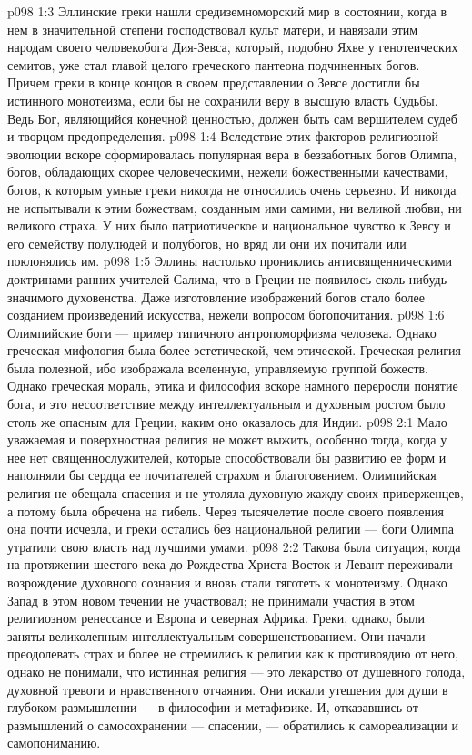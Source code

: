 \vs p098 1:3 Эллинские греки нашли средиземноморский мир в состоянии, когда в нем в значительной степени господствовал культ матери, и навязали этим народам своего человекобога Дия\hyp{}Зевса, который, подобно Яхве у генотеических семитов, уже стал главой целого греческого пантеона подчиненных богов. Причем греки в конце концов в своем представлении о Зевсе достигли бы истинного монотеизма, если бы не сохранили веру в высшую власть Судьбы. Ведь Бог, являющийся конечной ценностью, должен быть сам вершителем судеб и творцом предопределения.
\vs p098 1:4 Вследствие этих факторов религиозной эволюции вскоре сформировалась популярная вера в беззаботных богов Олимпа, богов, обладающих скорее человеческими, нежели божественными качествами, богов, к которым умные греки никогда не относились очень серьезно. И никогда не испытывали к этим божествам, созданным ими самими, ни великой любви, ни великого страха. У них было патриотическое и национальное чувство к Зевсу и его семейству полулюдей и полубогов, но вряд ли они их почитали или поклонялись им.
\vs p098 1:5 Эллины настолько прониклись антисвященническими доктринами ранних учителей Салима, что в Греции не появилось сколь\hyp{}нибудь значимого духовенства. Даже изготовление изображений богов стало более созданием произведений искусства, нежели вопросом богопочитания.
\vs p098 1:6 Олимпийские боги --- пример типичного антропоморфизма человека. Однако греческая мифология была более эстетической, чем этической. Греческая религия была полезной, ибо изображала вселенную, управляемую группой божеств. Однако греческая мораль, этика и философия вскоре намного переросли понятие бога, и это несоответствие между интеллектуальным и духовным ростом было столь же опасным для Греции, каким оно оказалось для Индии.
\vs p098 2:1 Мало уважаемая и поверхностная религия не может выжить, особенно тогда, когда у нее нет священнослужителей, которые способствовали бы развитию ее форм и наполняли бы сердца ее почитателей страхом и благоговением. Олимпийская религия не обещала спасения и не утоляла духовную жажду своих приверженцев, а потому была обречена на гибель. Через тысячелетие после своего появления она почти исчезла, и греки остались без национальной религии --- боги Олимпа утратили свою власть над лучшими умами.
\vs p098 2:2 Такова была ситуация, когда на протяжении шестого века до Рождества Христа Восток и Левант переживали возрождение духовного сознания и вновь стали тяготеть к монотеизму. Однако Запад в этом новом течении не участвовал; не принимали участия в этом религиозном ренессансе и Европа и северная Африка. Греки, однако, были заняты великолепным интеллектуальным совершенствованием. Они начали преодолевать страх и более не стремились к религии как к противоядию от него, однако не понимали, что истинная религия --- это лекарство от душевного голода, духовной тревоги и нравственного отчаяния. Они искали утешения для души в глубоком размышлении --- в философии и метафизике. И, отказавшись от размышлений о самосохранении --- спасении, --- обратились к самореализации и самопониманию.
